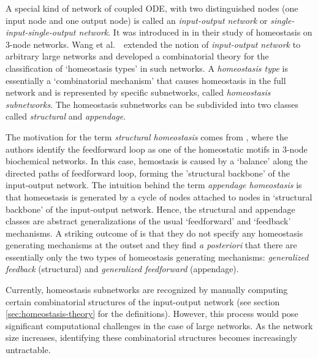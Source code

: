 \documentclass[pdflatex,sn-basic,Numbered]{sn-jnl}
\theoremstyle{thmstyleone}%
\newcommand{\etal}{\textrm{et al.\,}}
\numberwithin{equation}{section}
\begin{document}
A special kind of network of coupled ODE, with two distinguished nodes (one input node and one output node)
is called an \emph{input-output network} or \emph{single-input-single-output network}.
It was introduced in \cite{WHAG21} in their study of homeostasis on $3$-node networks.
Wang \etal~\cite{WHAG21} extended the notion of \emph{input-output network} to arbitrary large networks and developed a combinatorial theory for the classification of `homeostasis types' in such networks.
A \emph{homeostasis type} is essentially a `combinatorial mechanism' that causes homeostasis in the full network and is represented by specific subnetworks, called \emph{homeostasis subnetworks}.
The homeostasis subnetworks can be subdivided into two classes called \emph{structural} and \emph{appendage}.

The motivation for the term \emph{structural homeostasis} comes from \cite{RBGSN17}, where the authors identify the feedforward loop as one of the homeostatic motifs in $3$-node biochemical networks.
In this case, hemostasis is caused by a `balance' along the directed paths of feedforward loop, forming the 'structural backbone' of the input-output network.
The intuition behind the term \emph{appendage homeostasis} is that homeostasis is generated by a cycle of nodes attached to nodes in `structural backbone' of the input-output network.
Hence, the structural and appendage classes are abstract generalizations of the usual `feedforward' and `feedback' mechanisms. 
A striking outcome of \cite{WHAG21} is that they do not specify any homeostasis generating mechanisms at the outset and they find \emph{a posteriori} that there are essentially only the two types of homeostasis generating mechanisms: \emph{generalized feedback} (structural) and \emph{generalized feedforward} (appendage).

Currently, homeostasis subnetworks are recognized by manually computing certain combinatorial structures of the input-output network (see section \ref{sec:homeostasis-theory} for the definitions). 
However, this process would pose significant computational challenges in the case of large networks. 
As the network size increases, identifying these combinatorial structures becomes increasingly untractable. 
\end{document}
